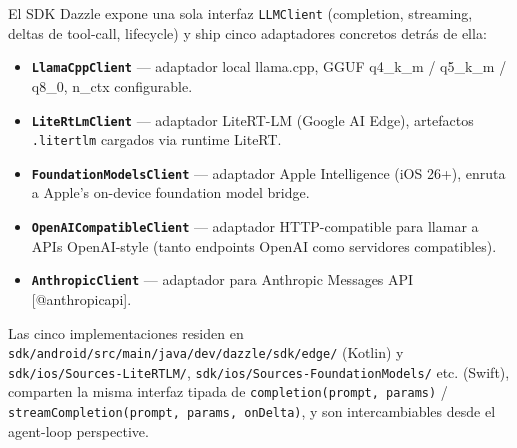 El SDK Dazzle expone una sola interfaz \texttt{LLMClient} (completion,
streaming, deltas de tool-call, lifecycle) y ship cinco adaptadores concretos
detrás de ella:

\begin{itemize}
\tightlist
\item
  \textbf{\texttt{LlamaCppClient}} --- adaptador local llama.cpp, GGUF q4\_k\_m
  / q5\_k\_m / q8\_0, n\_ctx configurable.
\item
  \textbf{\texttt{LiteRtLmClient}} --- adaptador LiteRT-LM (Google AI Edge),
  artefactos \texttt{.litertlm} cargados via runtime LiteRT.
\item
  \textbf{\texttt{FoundationModelsClient}} --- adaptador Apple Intelligence (iOS
  26+), enruta a Apple's on-device foundation model bridge.
\item
  \textbf{\texttt{OpenAICompatibleClient}} --- adaptador HTTP-compatible para
  llamar a APIs OpenAI-style (tanto endpoints OpenAI como servidores
  compatibles).
\item
  \textbf{\texttt{AnthropicClient}} --- adaptador para Anthropic Messages API
  {[}@anthropicapi{]}.
\end{itemize}

Las cinco implementaciones residen en
\texttt{sdk/android/src/main/java/dev/dazzle/sdk/edge/} (Kotlin) y
\texttt{sdk/ios/Sources-LiteRTLM/}, \texttt{sdk/ios/Sources-FoundationModels/}
etc. (Swift), comparten la misma interfaz tipada de
\texttt{completion(prompt,\ params)} /
\texttt{streamCompletion(prompt,\ params,\ onDelta)}, y son intercambiables
desde el agent-loop perspective.
